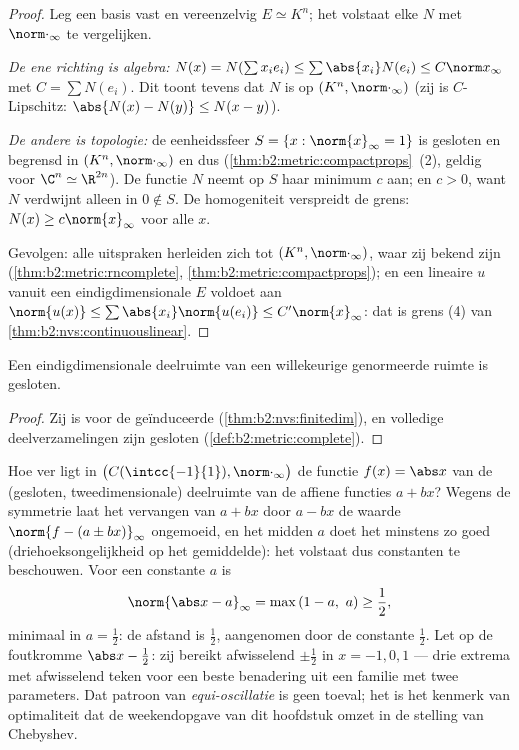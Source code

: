 \begin{proof}
Leg een basis vast en vereenzelvig $E \simeq K^n$; het volstaat
elke  $N$ met $\norm\cdot_\infty$ te vergelijken.

\emph{De ene richting is algebra:} $N(x) = N(\sum x_i e_i) \leq
\sum \abs{x_i} N(e_i) \leq C \norm x_\infty$ met $C = \sum N(e_i)$.
Dit toont tevens dat $N$  is op $(K^n, \norm\cdot_\infty)$
(zij is $C$-Lipschitz: $\abs{N(x) - N(y)} \leq N(x - y)$).

\emph{De andere is topologie:} de eenheidssfeer $S = \{x :
\norm{x}_\infty = 1\}$ is gesloten en begrensd in $(K^n,
\norm\cdot_\infty)$ en dus 
(\cref{thm:b2:metric:compactprops}~(2), geldig voor $\C^n \simeq
\R^{2n}$). De  functie $N$ neemt op $S$ haar minimum $c$
aan; en $c > 0$, want $N$ verdwijnt alleen in $0 \notin S$. De
homogeniteit verspreidt de grens: $N(x) \geq c \norm{x}_\infty$
voor alle $x$.

Gevolgen: alle uitspraken herleiden zich tot $(K^n,
\norm\cdot_\infty)$, waar zij bekend zijn
(\cref{thm:b2:metric:rncomplete},
\cref{thm:b2:metric:compactprops}); en een lineaire $u$ vanuit een
eindigdimensionale $E$ voldoet aan $\norm{u(x)} \leq \sum\abs{x_i}
\norm{u(e_i)} \leq C'\norm{x}_\infty$: dat is grens (4) van
\cref{thm:b2:nvs:continuouslinear}.
\end{proof}

\begin{corollary}\label{cor:b2:nvs:closedsubspace}
Een eindigdimensionale deelruimte van een willekeurige genormeerde
ruimte is gesloten.
\end{corollary}

\begin{proof}
Zij is  voor de geïnduceerde 
(\cref{thm:b2:nvs:finitedim}), en volledige deelverzamelingen zijn
gesloten (\cref{def:b2:metric:complete}).
\end{proof}

\begin{example}\label{ex:b2:nvs:bestaffine}
Hoe ver ligt in $\bigl(C(\intcc{-1}{1}), \norm\cdot_\infty\bigr)$
de functie $f(x) = \abs x$ van de (gesloten, tweedimensionale)
deelruimte van de affiene functies $a + bx$? Wegens de symmetrie
laat het vervangen van $a + bx$ door $a - bx$ de waarde $\norm{f -
(a \pm bx)}_\infty$ ongemoeid, en het midden $a$ doet het minstens
zo goed (driehoeksongelijkheid op het gemiddelde): het volstaat dus
constanten te beschouwen. Voor een constante $a$ is
\[
\norm{\abs x - a}_\infty = \max\,(1 - a,\ a)
\geq \frac12 ,
\]
minimaal in $a = \frac12$: de afstand is $\frac12$, aangenomen door
de constante $\frac12$. Let op de foutkromme $\abs x - \frac12$:
zij bereikt afwisselend $\pm\frac12$ in $x = -1, 0, 1$ --- drie
extrema met afwisselend teken voor een beste benadering uit een
familie met twee parameters. Dat patroon van
\emph{equi-oscillatie} is geen toeval; het is het kenmerk van
optimaliteit dat de weekendopgave van dit hoofdstuk omzet in de
stelling van Chebyshev.
\end{example}

